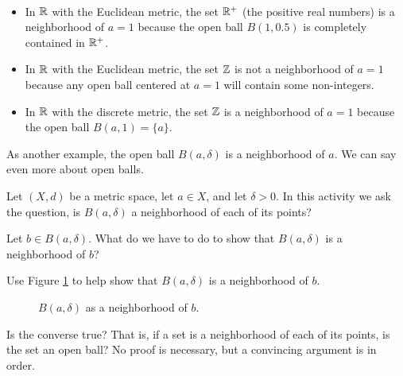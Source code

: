 \begin{example} \label{exp:neighborhood_MS} ~
\begin{itemize}
\item In $\mathbb{R}$ with the Euclidean metric, the set $\mathbb{R}^+$ (the positive real numbers) is a neighborhood of $a=1$ because the open ball $B(1,0.5)$ is completely contained in $\mathbb{R}^+$.  
\item In $\mathbb{R}$ with the Euclidean metric, the set $\mathbb{Z}$ is not a neighborhood of $a=1$ because any open ball centered at $a=1$ will contain some non-integers. 
\item In $\mathbb{R}$ with the discrete metric, the set $\mathbb{Z}$ is a neighborhood of $a=1$ because the open ball $B(a,1) = \{a\}$. 
\end{itemize}

\end{example}
 
As another example, the open ball $B(a, \delta)$ is a neighborhood of $a$. We can say even more about open balls. 

\begin{activity} Let $(X, d)$ be a metric space, let $a \in X$, and let $\delta > 0$.  In this activity we ask the question, is $B(a, \delta)$ a neighborhood of each of its points? 
\ba
\item Let $b \in B(a, \delta)$. What do we have to do to show that $B(a, \delta)$ is a neighborhood of $b$? 

\item Use Figure \ref{F:Open_ball_neighborhood} to help show that $B(a, \delta)$ is a neighborhood of $b$.
\begin{figure}[h]
\begin{center}
\caption{$B(a, \delta)$ as a neighborhood of $b$.} 
\label{F:Open_ball_neighborhood}
\end{center}
\end{figure}

\item Is the converse true? That is, if a set is a neighborhood of each of its points, is the set an open ball? No proof is necessary, but a convincing argument is in order. 

\ea

\end{activity}

